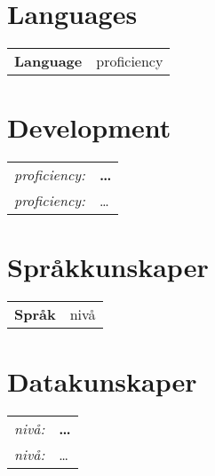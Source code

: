 \ifinenglish
\begin{multicols}{2}
\section{Languages}
\begin{tabular}{r @{ -- } l}
\bf Language & proficiency		\\
\end{tabular}
\section{Development}
\begin{tabular}{r l}
{\it proficiency:} & {\bf \ldots}\\
{\it proficiency:} & \ldots
\end{tabular}
\end{multicols}
\else
\begin{multicols}{2}
\section{Språkkunskaper}
\begin{tabular}{r @{ -- } l}
\bf Språk & nivå	\\
\end{tabular}
\section{Datakunskaper}
\begin{tabular}{r l}
{\it nivå:} & {\bf \ldots}\\
{\it nivå:} & \ldots
\end{tabular}
\end{multicols}
\fi
\vspace*{-1em}